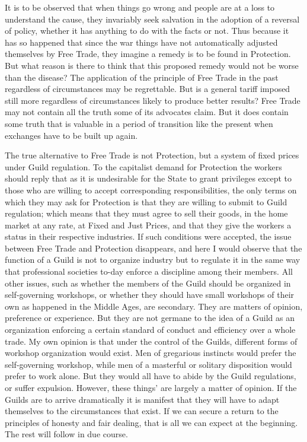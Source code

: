 \documentclass{book}
\begin{document}
It is to be observed that when things go wrong and people are at a loss to understand the cause, they invariably seek salvation in the adoption of a reversal of policy, whether it has anything to do with the facts or not. Thus because it has so happened that since the war things have not automatically adjusted themselves by Free Trade, they imagine a remedy is to be found in Protection. But what reason is there to think that this proposed remedy would not be worse than the disease? The application of the principle of Free Trade in the past regardless of circumstances may be regrettable. But is a general tariff imposed still more regardless of circumstances likely to produce better results? Free Trade may not contain all the truth some of its advocates claim. But it does contain some truth that is valuable in a period of transition like the present when exchanges have to be built up again.

The true alternative to Free Trade is not Protection, but a system of fixed prices under Guild regulation. To the capitalist demand for Protection the workers should reply that as it is undesirable for the State to grant privileges except to those who are willing to accept corresponding responsibilities, the only terms on which they may ask for Protection is that they are willing to submit to Guild regulation; which means that they must agree to sell their goods, in the home market at any rate, at Fixed and Just Prices, and that they give the workers a status in their respective industries. If such conditions were accepted, the issue between Free Trade and Protection disappears, and here I would observe that the function of a Guild is not to organize industry but to regulate it in the same way that professional societies to-day enforce a discipline among their members. All other issues, such as whether the members of the Guild should be organized in self-governing workshops, or whether they should have small workshops of their own as happened in the Middle Ages, are secondary. They are matters of opinion, preference or experience. But they are not germane to the idea of a Guild as an organization enforcing a certain standard of conduct and efficiency over a whole trade. My own opinion is that under the control of the Guilds, different forms of workshop organization would exist. Men of gregarious instincts would prefer the self-governing workshop, while men of a masterful or solitary disposition would prefer to work alone. But they would all have to abide by the Guild regulations, or suffer expulsion. However, these things’ are largely a matter of opinion. If the Guilds are to arrive dramatically it is manifest that they will have to adapt themselves to the circumstances that exist. If we can secure a return to the principles of honesty and fair dealing, that is all we can expect at the beginning. The rest will follow in due course.
\end{document}
